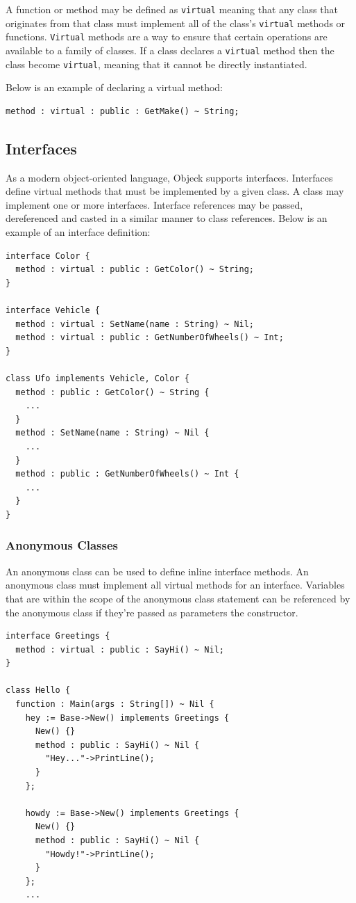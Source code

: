 \documentclass[11pt]{article}
\begin{document}
A function or method may be defined as \texttt{virtual} meaning that
any class that originates from that class must implement all of the
class's \texttt{virtual} methods or functions.  \texttt{Virtual}
methods are a way to ensure that certain operations are available to a
family of classes. If a class declares a \texttt{virtual} method then
the class become \texttt{virtual}, meaning that it cannot be directly
instantiated.

Below is an example of declaring a virtual method:
\begin{verbatim}
method : virtual : public : GetMake() ~ String;
\end{verbatim}

\subsection{Interfaces}
As a modern object-oriented language, Objeck supports interfaces.
Interfaces define virtual methods that must be implemented by a given
class.  A class may implement one or more interfaces.  Interface
references may be passed, dereferenced and casted in a similar manner
to class references.  Below is an example of an interface definition:

\begin{verbatim}
interface Color {
  method : virtual : public : GetColor() ~ String;
}

interface Vehicle {
  method : virtual : SetName(name : String) ~ Nil;
  method : virtual : public : GetNumberOfWheels() ~ Int;
}

class Ufo implements Vehicle, Color {
  method : public : GetColor() ~ String {
    ...
  }
  method : SetName(name : String) ~ Nil {
    ...
  }
  method : public : GetNumberOfWheels() ~ Int {
    ...
  }
}
\end{verbatim}

\subsubsection{Anonymous Classes}
An anonymous class can be used to define inline interface methods.  An anonymous class must implement all virtual methods for an interface.  Variables that are within the scope of the anonymous class statement can be referenced by the anonymous class if they're passed as parameters the constructor.

\begin{verbatim}
interface Greetings {
  method : virtual : public : SayHi() ~ Nil;
}

class Hello {
  function : Main(args : String[]) ~ Nil {
    hey := Base->New() implements Greetings {
      New() {}
      method : public : SayHi() ~ Nil {
        "Hey..."->PrintLine();
      }
    };

    howdy := Base->New() implements Greetings {
      New() {}
      method : public : SayHi() ~ Nil {
        "Howdy!"->PrintLine();
      }
    };
    ...

\end{verbatim}
\end{document}
